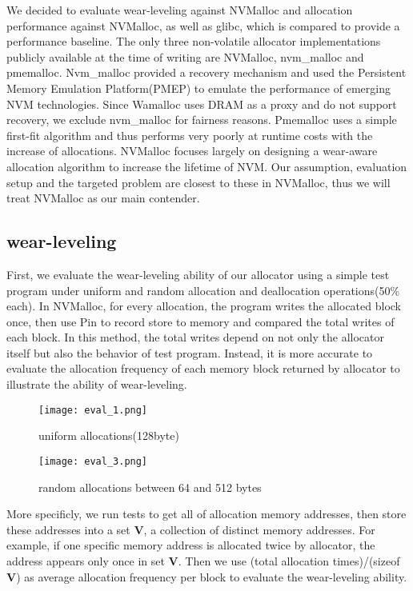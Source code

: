 \documentclass[10pt, conference, compsocconf]{IEEEtran}
\begin{document}
We decided to evaluate wear-leveling against NVMalloc and allocation performance against NVMalloc, as well as glibc,
which is compared to provide a performance baseline. 
The only three non-volatile allocator implementations publicly available at the time of writing are 
NVMalloc, nvm\_malloc\cite{schwalbnvm} and pmemalloc.
Nvm\_malloc provided a recovery mechanism and used the Persistent Memory Emulation Platform(PMEP)\cite{dulloor2014system} to emulate the performance of emerging NVM technologies.
Since Wamalloc uses DRAM as a proxy and do not support recovery, we exclude nvm\_malloc for fairness reasons.
Pmemalloc uses a simple first-fit algorithm and thus performs very poorly at runtime costs with the increase of allocations.
NVMalloc focuses largely on designing a wear-aware allocation algorithm to increase the lifetime of NVM.
Our assumption, evaluation setup and the targeted problem are closest to these in NVMalloc, 
thus we will treat NVMalloc as our main contender.

\subsection{wear-leveling}

First, we evaluate the wear-leveling ability of our allocator
using a simple test program under uniform and random allocation and deallocation operations(50\% each).
In NVMalloc, for every allocation, the program writes the allocated block once, then use Pin\cite{luk2005pin} to record store to memory and compared the total writes of each block.
In this method, the total writes depend on not only the allocator itself but also the behavior of test program.
Instead, it is more accurate to evaluate the allocation frequency of each memory block 
returned by allocator to illustrate the ability of wear-leveling.

\begin{figure}[t]
\centering
\texttt{[image: eval\_1.png]}
\caption{uniform allocations(128byte)}
\label{fig:eval_1}
\end{figure}

\begin{figure}[t]
\centering
\texttt{[image: eval\_3.png]}
\caption{random allocations between 64 and 512 bytes}
\label{fig:eval_3}
\end{figure}

More specificly, we run tests to get all of allocation memory addresses, 
then store these addresses into a set \textbf{V},
a collection of distinct memory addresses.
For example, if one specific memory address is allocated twice by allocator, the address appears only once in set \textbf{V}.
Then we use (total allocation times)/(sizeof \textbf{V}) as average allocation frequency per block to evaluate the wear-leveling ability.
\end{document}
